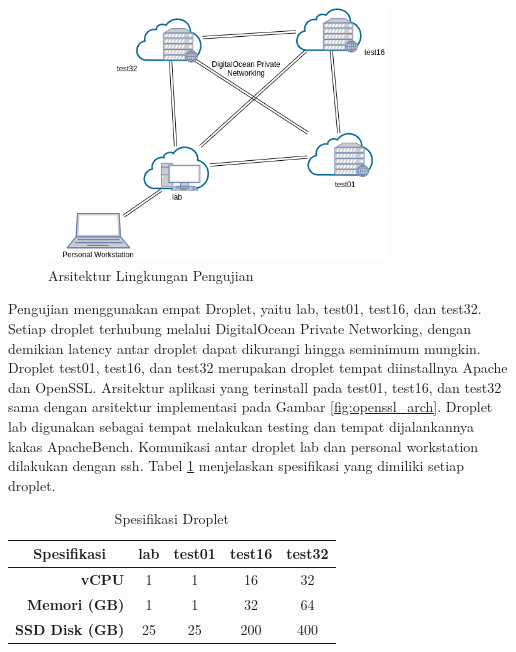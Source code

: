 \begin{figure}[h]
  \centering
  \includegraphics[width=0.8\textwidth]{resources/ch-4/testing_arch.png}
  \caption{Arsitektur Lingkungan Pengujian}
  \label{fig:testing_arch}
\end{figure}

Pengujian menggunakan empat Droplet, yaitu lab, test01, test16, dan test32. Setiap droplet terhubung melalui DigitalOcean Private Networking, dengan demikian latency antar droplet dapat dikurangi hingga seminimum mungkin. Droplet test01, test16, dan test32 merupakan droplet tempat diinstallnya Apache dan OpenSSL. Arsitektur aplikasi yang terinstall pada test01, test16, dan test32 sama dengan arsitektur implementasi pada Gambar \ref{fig:openssl_arch}. Droplet lab digunakan sebagai tempat melakukan testing dan tempat dijalankannya kakas ApacheBench. Komunikasi antar droplet lab dan personal workstation dilakukan dengan ssh. Tabel \ref{tab:droplet_specs} menjelaskan spesifikasi yang dimiliki setiap droplet.

\begin{table}[]
  \caption{Spesifikasi Droplet} %
  \label{tab:droplet_specs}
  \centering %
  \begin{tabular}{@{}rcccc@{}}
\toprule
\multicolumn{1}{c}{\textbf{Spesifikasi}} & \textbf{lab} & \textbf{test01} & \textbf{test16} & \textbf{test32} \\ \midrule
\textbf{vCPU}                            & 1            & 1               & 16              & 32              \\
\textbf{Memori (GB)}                          & 1          & 1             & 32            & 64            \\
\textbf{SSD Disk (GB)}                        & 25         & 25            & 200           & 400           \\ \bottomrule
\end{tabular}
\end{table}

